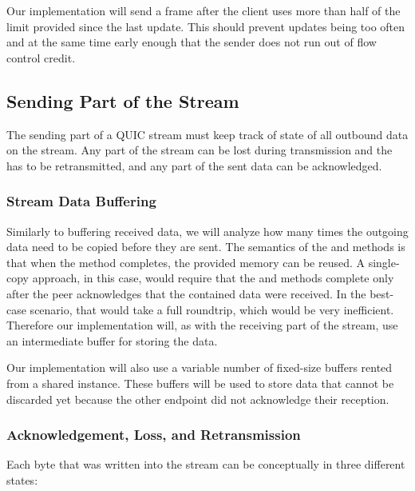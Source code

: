 Our implementation will send a \MAXSTREAMDATA{} frame after the client uses more than half of the
limit provided since the last update. This should prevent updates being too often and at the same
time early enough that the sender does not run out of flow control credit.

\subsection{Sending Part of the Stream}\label{sec:03-send-stream}

The sending part of a QUIC stream must keep track of state of all outbound data on the stream. Any
part of the stream can be lost during transmission and the has to be retransmitted, and any part of
the sent data can be acknowledged.

\subsubsection{Stream Data Buffering}

Similarly to buffering received data, we will analyze how many times the outgoing data need to be
copied before they are sent. The semantics of the  and  methods is
that when the method completes, the provided memory can be reused.  A
single-copy approach, in this case, would require that the  and 
methods complete only after the peer acknowledges that the contained data were received. In the
best-case scenario, that would take a full roundtrip, which would be very inefficient. Therefore our
implementation will, as with the receiving part of the stream, use an intermediate buffer for
storing the data.

Our implementation will also use a variable number of fixed-size buffers rented from a shared
\ArrayPoolOf{\byte{}} instance. These buffers will be used to store data that cannot be discarded
yet because the other endpoint did not acknowledge their reception.

\subsubsection{Acknowledgement, Loss, and Retransmission}

Each byte that was written into the stream can be conceptually in three different states:

